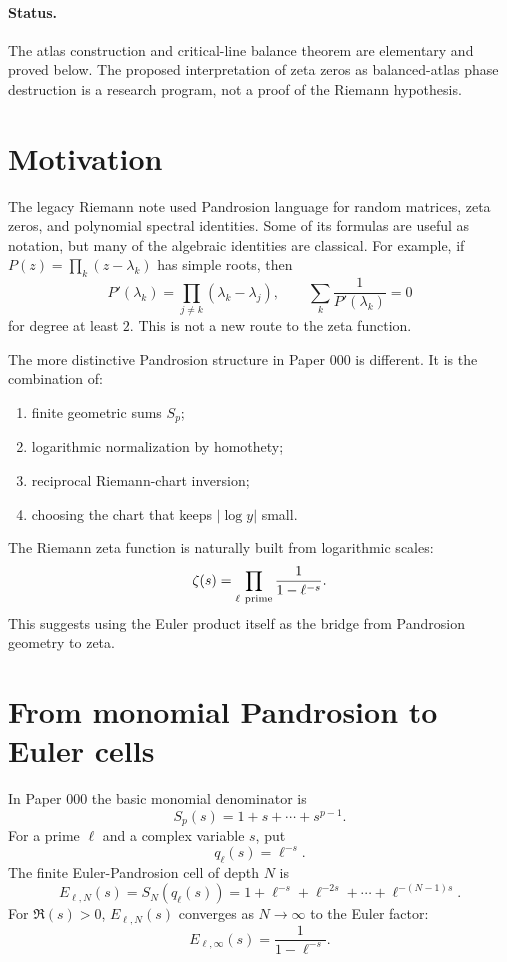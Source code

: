 \documentclass[11pt]{article}
\begin{document}
\paragraph{Status.}
The atlas construction and critical-line balance theorem are elementary and
proved below.  The proposed interpretation of zeta zeros as balanced-atlas
phase destruction is a research program, not a proof of the Riemann hypothesis.

\tableofcontents

\section{Motivation}

The legacy Riemann note used Pandrosion language for random matrices, zeta
zeros, and polynomial spectral identities.  Some of its formulas are useful as
notation, but many of the algebraic identities are classical.  For example,
if \(P(z)=\prod_k(z-\lambda_k)\) has simple roots, then
\[
        P'(\lambda_k)=\prod_{j\ne k}(\lambda_k-\lambda_j),
        \qquad
        \sum_k\frac{1}{P'(\lambda_k)}=0
\]
for degree at least \(2\).  This is not a new route to the zeta function.

The more distinctive Pandrosion structure in Paper 000 is different.  It is
the combination of:
\begin{enumerate}[leftmargin=2em]
\item finite geometric sums \(S_p\);
\item logarithmic normalization by homothety;
\item reciprocal Riemann-chart inversion;
\item choosing the chart that keeps \(|\log y|\) small.
\end{enumerate}
The Riemann zeta function is naturally built from logarithmic scales:
\[
        \zeta(s)=\prod_{\ell\ {\rm prime}}\frac{1}{1-\ell^{-s}}.
\]
This suggests using the Euler product itself as the bridge from Pandrosion
geometry to zeta.

\section{From monomial Pandrosion to Euler cells}

In Paper 000 the basic monomial denominator is
\[
        S_p(s)=1+s+\cdots+s^{p-1}.
\]
For a prime \(\ell\) and a complex variable \(s\), put
\[
        q_\ell(s)=\ell^{-s}.
\]
The finite Euler-Pandrosion cell of depth \(N\) is
\[
        E_{\ell,N}(s)
        =S_N(q_\ell(s))
        =1+\ell^{-s}+\ell^{-2s}+\cdots+\ell^{-(N-1)s}.
\]
For \(\Re(s)>0\), \(E_{\ell,N}(s)\) converges as \(N\to\infty\) to the Euler
factor:
\[
        E_{\ell,\infty}(s)=\frac{1}{1-\ell^{-s}}.
\]
\end{document}
